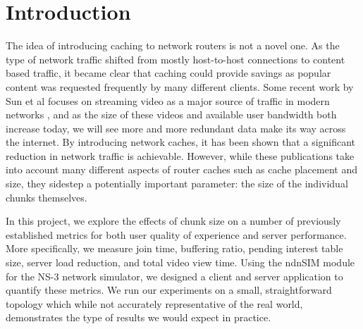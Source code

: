 \section{Introduction} \label{sec:Intro}

The idea of introducing caching to network routers is not a novel one. As the
type of network traffic shifted from mostly host-to-host connections to content
based traffic, it became clear that caching could provide savings as popular
content was requested frequently by many different clients. Some recent work by
Sun et al focuses on streaming video as a major source of traffic in modern
networks \cite{2}, and as the size of these videos and available user bandwidth both
increase today, we will see more and more redundant data make its way across
the internet. By introducing network caches, it has been shown that a
significant reduction in network traffic is achievable. However, while these
publications take into account many different aspects of router caches such as
cache placement and size, they sidestep a potentially important parameter: the
size of the individual chunks themselves. 

In this project, we explore the effects of chunk size on a number of previously
established metrics for both user quality of experience and server performance.
More specifically, we measure join time, buffering ratio, pending interest table
size, server load reduction, and total video view time. Using the ndnSIM module 
for the NS-3 network simulator, we designed a client and server application to quantify
these metrics. We run our experiments on a small, straightforward topology which
while not accurately representative of the real world, demonstrates the type of
results we would expect in practice. 

